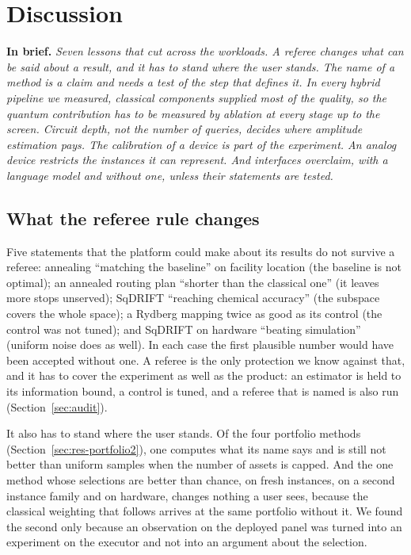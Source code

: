 \documentclass[11pt,a4paper]{article}
\newcommand{\inbrief}[1]{\par\smallskip\noindent\textbf{In brief.} \emph{#1}\par\medskip}
\begin{document}
\section{Discussion}
\label{sec:discussion}

\inbrief{Seven lessons that cut across the workloads. A referee changes
what can be said about a result, and it has to stand where the user stands.
The name of a method is a claim and needs a
test of the step that defines it. In every hybrid pipeline we measured,
classical components supplied most of the quality, so the quantum
contribution has to be measured by ablation at every stage up to the screen.
Circuit depth, not the number of queries, decides where amplitude estimation
pays. The calibration of a device is part of the experiment. An analog
device restricts the instances it can represent. And interfaces overclaim,
with a language model and without one, unless their statements are tested.}

\subsection{What the referee rule changes}

Five statements that the platform could make about its results do not
survive a referee: annealing ``matching the
baseline'' on facility location (the baseline is not optimal); an annealed
routing plan ``shorter than the classical one'' (it leaves more stops
unserved); SqDRIFT ``reaching chemical
accuracy'' (the subspace covers the whole space); a Rydberg mapping twice
as good as its control (the control was not tuned); and SqDRIFT on hardware
``beating simulation'' (uniform
noise does as well). In each case the first plausible number would have
been accepted without one. A referee is the
only protection we know against that, and it has to cover the experiment as
well as the product: an estimator is held to its information bound, a
control is tuned, and a referee that is named is also run
(Section~\ref{sec:audit}).

It also has to stand where the user stands. Of the four portfolio methods
(Section~\ref{sec:res-portfolio2}), one computes what its
name says and is still not better than uniform samples when the number of
assets is capped. And the one method whose selections are better than
chance, on fresh instances, on a second instance family and on hardware,
changes nothing a user sees, because the classical weighting that follows
arrives at the same portfolio without it. We found the second only because
an observation on the deployed panel was turned into an experiment on the
executor and not into an argument about the selection.
\end{document}
